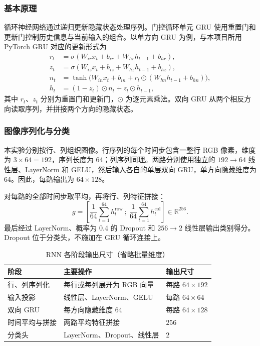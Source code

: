 \documentclass[UTF8,a4paper,zihao=-4,fontset=fandol]{ctexart}
\begin{document}
\subsubsection{基本原理}
循环神经网络通过递归更新隐藏状态处理序列。门控循环单元 GRU 使用重置门和更新门控制历史信息与当前输入的组合。以单方向 GRU 为例，与本项目所用 PyTorch GRU 对应的更新形式为
\begin{align}
 r_t &= \sigma(W_{ir}x_t+b_{ir}+W_{hr}h_{t-1}+b_{hr}),\\
 z_t &= \sigma(W_{iz}x_t+b_{iz}+W_{hz}h_{t-1}+b_{hz}),\\
 n_t &= \tanh\bigl(W_{in}x_t+b_{in}+r_t\odot(W_{hn}h_{t-1}+b_{hn})\bigr),\\
 h_t &= (1-z_t)\odot n_t+z_t\odot h_{t-1},
\end{align}
其中 $r_t$、$z_t$ 分别为重置门和更新门，$\odot$ 为逐元素乘法。双向 GRU 从两个相反方向读取序列，并拼接两个方向的隐藏状态。

\subsubsection{图像序列化与分类}
本实验分别按行、列组织图像。行序列的每个时间步包含一整行 RGB 像素，维度为 $3\times64=192$，序列长度为 64；列序列同理。两路分别使用独立的 $192\rightarrow64$ 线性层、LayerNorm 和 GELU，然后输入各自的单层双向 GRU，单方向隐藏维度为 64。因此，每路输出为 $64\times128$。

对每路的全部时间步取平均，再将行、列特征拼接：
\begin{equation}
 g=\left[\frac{1}{64}\sum_{t=1}^{64}h_t^{\mathrm{row}}\ ;\ 
          \frac{1}{64}\sum_{t=1}^{64}h_t^{\mathrm{col}}\right]\in\mathbb{R}^{256}.
\end{equation}
最后经过 LayerNorm、概率为 $0.4$ 的 Dropout 和 $256\rightarrow2$ 线性层输出类别得分。Dropout 位于分类头，不施加在 GRU 循环连接上。

\begin{table}[htbp]
\centering\small
\caption{RNN 各阶段输出尺寸（省略批量维度）}
\begin{tabularx}{\textwidth}{lYl}
\toprule
阶段 & 主要操作 & 输出尺寸\\
\midrule
行、列序列化 & 每行或每列展开为 RGB 向量 & 每路 $64\times192$\\
输入投影 & 线性层、LayerNorm、GELU & 每路 $64\times64$\\
双向 GRU & 每方向隐藏维度 64 & 每路 $64\times128$\\
时间平均与拼接 & 两路平均特征拼接 & $256$\\
分类头 & LayerNorm、Dropout、线性层 & $2$\\
\bottomrule
\end{tabularx}
\end{table}
\end{document}

